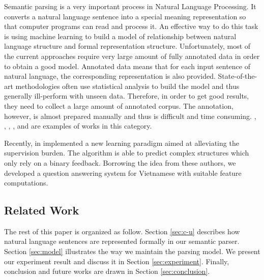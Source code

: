 \label{sec:introduction}

Semantic parsing is a very important process in Natural Language Processing. It converts a natural language sentence into a special meaning representation so that computer programs can read and process it. An effective way to do this task is using machine learning to build a model of relationship between natural language structure and formal representation structure. Unfortunately, most of the current approaches require very large amount of fully annotated data in order to obtain a good model. Annotated data means that for each input sentence of natural language, the corresponding representation is also provided. State-of-the-art methodologies often use statistical analysis to build the model and thus generally ill-perform with unseen data. Therefore, in order to get good results, they need to collect a large amount of annotated corpus. The annotation, however, is almost prepared manually and thus is difficult and time consuming. \cite{Zelle:1996:LPD:1864519.1864543}, \cite{Tang:2001:UMC:645328.650015}, \cite{Zettlemoyer05learningto}, \cite{Ge:2005:SSP:1706543.1706546}, \cite{Zettlemoyer07onlinelearning} and \cite{Wong07learningsynchronous} are examples of works in this category.

Recently, \citeauthor{Clarke:2010:DSP:1870568.1870571} in \cite{Clarke:2010:DSP:1870568.1870571} implemented a new learning paradigm aimed at alleviating the supervision burden. The algorithm is able to predict complex structures which only rely on a binary feedback. Borrowing the idea from these authors, we developed a question answering system for Vietnamese with suitable feature computations.

\subsection*{Related Work}


The rest of this paper is organized as follow. Section \ref{sec:c-u} describes how natural language sentences are represented formally in our semantic parser. Section \ref{sec:model} illustrates the way we maintain the parsing model. We present our experiment result and discuss it in Section \ref{sec:experiment}. Finally, conclusion and future works are drawn in Section \ref{sec:conclusion}.